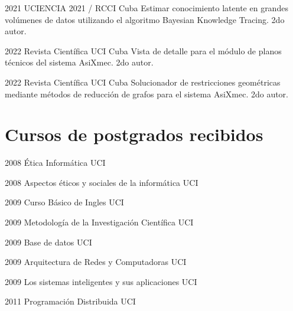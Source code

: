 \documentclass[letterpaper]{twentyonesecondcv} %
\begin{document}
{\begin{twentymid}
    	\twentyitem
    	{2021}
    	{UCIENCIA 2021 / RCCI}
    	{Cuba}
    	{Estimar conocimiento latente en grandes volúmenes de datos utilizando el algoritmo Bayesian Knowledge Tracing. 2do autor. }
    	
    	\twentyitem
    	{2022}
    	{Revista Científica UCI}
    	{Cuba}
    	{Vista de detalle para el módulo de planos técnicos del sistema AsiXmec. 2do autor.}
    	
    	\twentyitem
    	{2022}
    	{Revista Científica UCI}
    	{Cuba}
    	{Solucionador de restricciones geométricas mediante métodos de reducción de grafos para el sistema AsiXmec. 2do autor. }
    	
    \end{twentymid}
    
    \section{Cursos de postgrados recibidos}
    \begin{twentymid}
    	
    	\twentymiditem
    	{2008}
    	{Ética Informática}
    	{UCI}
    	
    	\twentymiditem
    	{2008}
    	{Aspectos éticos y sociales de la informática}
    	{UCI}
    	
    	\twentymiditem
    	{2009}
    	{Curso Básico de Ingles}
    	{UCI}
    	
    	\twentymiditem
    	{2009}
    	{Metodología de la Investigación Científica}
    	{UCI}
    	
    	\twentymiditem
    	{2009}
    	{Base de datos}
    	{UCI}
    	
    	\twentymiditem
    	{2009}
    	{Arquitectura de Redes y Computadoras}
    	{UCI}
    	
    	\twentymiditem
    	{2009}
    	{Los sistemas inteligentes y sus aplicaciones}
    	{UCI}
    	
    	\twentymiditem
    	{2011}
    	{Programación Distribuida}
    	{UCI}
	
    \end{twentymid}
}

\end{document}
